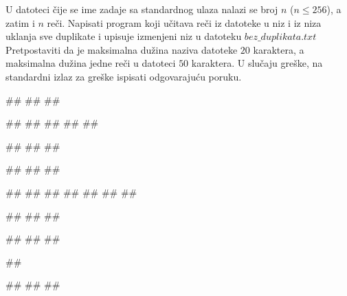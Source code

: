 \begin{Exercise}[label=p3_iv5]         
U datoteci čije se ime zadaje sa standardnog ulaza nalazi
se broj $n$ ($n\leq 256$), a zatim i $n$ reči. 
Napisati program koji učitava reči iz datoteke u niz i iz niza uklanja sve duplikate 
i upisuje izmenjeni niz u datoteku $bez\_duplikata.txt$ 
Pretpostaviti da je maksimalna dužina naziva datoteke $20$ karaktera, 
a maksimalna dužina jedne reči u datoteci $50$ karaktera.
U slučaju greške, na standardni izlaz za greške ispisati odgovarajuću poruku.

\begin{minitest}
\begin{upotreba}{1}
#\naslovInt#
##
##

##
##
##
##
##

##
##
##
\end{upotreba}
\end{minitest}
\begin{minitest}
\begin{upotreba}{2}
#\naslovInt#
##
##

##
##
##
##
##
##
##

##
##
##
\end{upotreba}
\end{minitest}
\begin{minitest}
\begin{upotreba}{3}
#\naslovInt#
##
##

##

#\naslovIzlazZaGresku#
##
##
\end{upotreba}
\end{minitest}
\end{Exercise}
\begin{Answer}[ref=p3_iv5]
\end{Answer}

